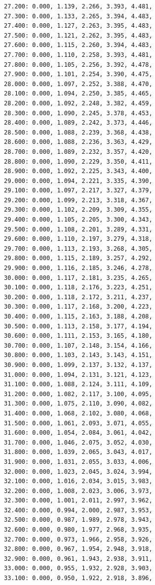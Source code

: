 \documentclass[12pt, a4paper]{article}
\begin{document}
\begin{scriptsize}
\begin{ttfamily}
\begin{lstlisting}
27.200: 0.000, 1.139, 2.266, 3.393, 4.481, 
27.300: 0.000, 1.133, 2.265, 3.394, 4.483, 
27.400: 0.000, 1.127, 2.263, 3.395, 4.483, 
27.500: 0.000, 1.121, 2.262, 3.395, 4.483, 
27.600: 0.000, 1.115, 2.260, 3.394, 4.483, 
27.700: 0.000, 1.110, 2.258, 3.393, 4.481, 
27.800: 0.000, 1.105, 2.256, 3.392, 4.478, 
27.900: 0.000, 1.101, 2.254, 3.390, 4.475, 
28.000: 0.000, 1.097, 2.252, 3.388, 4.470, 
28.100: 0.000, 1.094, 2.250, 3.385, 4.465, 
28.200: 0.000, 1.092, 2.248, 3.382, 4.459, 
28.300: 0.000, 1.090, 2.245, 3.378, 4.453, 
28.400: 0.000, 1.089, 2.242, 3.373, 4.446, 
28.500: 0.000, 1.088, 2.239, 3.368, 4.438, 
28.600: 0.000, 1.088, 2.236, 3.363, 4.429, 
28.700: 0.000, 1.089, 2.232, 3.357, 4.420, 
28.800: 0.000, 1.090, 2.229, 3.350, 4.411, 
28.900: 0.000, 1.092, 2.225, 3.343, 4.400, 
29.000: 0.000, 1.094, 2.221, 3.335, 4.390, 
29.100: 0.000, 1.097, 2.217, 3.327, 4.379, 
29.200: 0.000, 1.099, 2.213, 3.318, 4.367, 
29.300: 0.000, 1.102, 2.209, 3.309, 4.355, 
29.400: 0.000, 1.105, 2.205, 3.300, 4.343, 
29.500: 0.000, 1.108, 2.201, 3.289, 4.331, 
29.600: 0.000, 1.110, 2.197, 3.279, 4.318, 
29.700: 0.000, 1.113, 2.193, 3.268, 4.305, 
29.800: 0.000, 1.115, 2.189, 3.257, 4.292, 
29.900: 0.000, 1.116, 2.185, 3.246, 4.278, 
30.000: 0.000, 1.117, 2.181, 3.235, 4.265, 
30.100: 0.000, 1.118, 2.176, 3.223, 4.251, 
30.200: 0.000, 1.118, 2.172, 3.211, 4.237, 
30.300: 0.000, 1.117, 2.168, 3.200, 4.223, 
30.400: 0.000, 1.115, 2.163, 3.188, 4.208, 
30.500: 0.000, 1.113, 2.158, 3.177, 4.194, 
30.600: 0.000, 1.111, 2.153, 3.165, 4.180, 
30.700: 0.000, 1.107, 2.148, 3.154, 4.166, 
30.800: 0.000, 1.103, 2.143, 3.143, 4.151, 
30.900: 0.000, 1.099, 2.137, 3.132, 4.137, 
31.000: 0.000, 1.094, 2.131, 3.121, 4.123, 
31.100: 0.000, 1.088, 2.124, 3.111, 4.109, 
31.200: 0.000, 1.082, 2.117, 3.100, 4.095, 
31.300: 0.000, 1.075, 2.110, 3.090, 4.082, 
31.400: 0.000, 1.068, 2.102, 3.080, 4.068, 
31.500: 0.000, 1.061, 2.093, 3.071, 4.055, 
31.600: 0.000, 1.054, 2.084, 3.061, 4.042, 
31.700: 0.000, 1.046, 2.075, 3.052, 4.030, 
31.800: 0.000, 1.039, 2.065, 3.043, 4.017, 
31.900: 0.000, 1.031, 2.055, 3.033, 4.006, 
32.000: 0.000, 1.023, 2.045, 3.024, 3.994, 
32.100: 0.000, 1.016, 2.034, 3.015, 3.983, 
32.200: 0.000, 1.008, 2.023, 3.006, 3.973, 
32.300: 0.000, 1.001, 2.011, 2.997, 3.962, 
32.400: 0.000, 0.994, 2.000, 2.987, 3.953, 
32.500: 0.000, 0.987, 1.989, 2.978, 3.943, 
32.600: 0.000, 0.980, 1.977, 2.968, 3.935, 
32.700: 0.000, 0.973, 1.966, 2.958, 3.926, 
32.800: 0.000, 0.967, 1.954, 2.948, 3.918, 
32.900: 0.000, 0.961, 1.943, 2.938, 3.911, 
33.000: 0.000, 0.955, 1.932, 2.928, 3.903, 
33.100: 0.000, 0.950, 1.922, 2.918, 3.896, 

\end{lstlisting}
\end{ttfamily}
\end{scriptsize}
\end{document}
